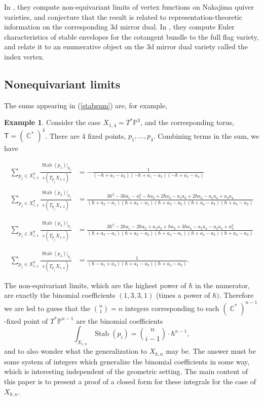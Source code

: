 \documentclass[12 pt]{article}
\theoremstyle{plain}
\theoremstyle{plain}
\theoremstyle{plain}
\theoremstyle{plain}
\theoremstyle{plain}
\theoremstyle{plain}
\theoremstyle{plain}
\theoremstyle{plain}
\theoremstyle{plain}
\theoremstyle{plain}
\theoremstyle{remark}
\theoremstyle{remark}
\theoremstyle{definition}
\theoremstyle{definition}
\theoremstyle{definition}
\newtheorem{example}{Example}[section]
\theoremstyle{definition}
\theoremstyle{definition}
\theoremstyle{definition}
\DeclareMathOperator{\C}{\mathbb{C}}
\DeclareMathOperator{\stab}{\text{Stab}}
\newcommand{\bT}{\mathsf{T}}
\begin{document}
In \cite{DSm}, they compute non-equivariant limits of vertex functions on Nakajima quiver varieties, and conjecture that the result is related to representation-theoretic information on the corresponding 3d mirror dual. In \cite{DSm2}, they compute Euler characteristics of stable envelopes for the cotangent bundle to the full flag variety, and relate it to an enumerative object on the 3d mirror dual variety called the index vertex. 

\subsection{Nonequivariant limits}

The sums appearing in (\ref{stabsum}) are, for example,

\begin{example}
Consider the case $X_{1,4}=T^*\mathbb P^3$, and the corresponding torus, $\bT=(\C^*)^4$. There are 4 fixed points, $p_1,\dots,p_4$. Combining terms in the sum, we have

\begin{align*}
\sum\limits_{p_{j}\in X_{1,4}^{\bT}}\frac{\stab(p_{1})|_{p_{j}}}{e(T_{p_{j}}X_{1,4})}
&=-\frac{1}{(-\hbar+a_{1}-a_{2})(-\hbar+a_{1}-a_{3})(-\hbar+a_{1}-a_{4})}\\
\\
\sum\limits_{p_{j}\in X_{1,4}^{\bT}}\frac{\stab(p_{2})|_{p_{j}}}{e(T_{p_{j}}X_{1,4})}
&=\frac{3\hbar^{2}-3\hbar a_{1}-a_{1}^{2}-\hbar a_{2}+2\hbar a_{3}-a_{1}a_{3}+2\hbar a_{4}-a_{1}a_{4}+a_{3}a_{4}}{(\hbar+a_{2}-a_{1})(\hbar+a_{3}-a_{1})(\hbar+a_{3}-a_{2})(\hbar+a_{4}-a_{3})(\hbar+a_{4}-a_{2})}\\
\\
\\
\sum\limits_{p_{j}\in X_{1,4}^{\bT}}\frac{\stab(p_{3})|_{p_{j}}}{e(T_{p_{j}}X_{1,4})}
&=\frac{3\hbar^{2}-2\hbar a_{1}-2\hbar a_{2}+a_{1}a_{2}+\hbar a_{3}+3\hbar a_{4}-a_{1}a_{4}-a_{2}a_{4}+a_{4}^2}{(\hbar+a_{3}-a_{1})(\hbar+a_{3}-a_{2})(\hbar+a_{4}-a_{1})(\hbar+a_{4}-a_{2})(\hbar+a_{4}-a_{3})}\\
\\
\\
\sum\limits_{p_{j}\in X_{1,4}^{\bT}}\frac{\stab(p_{4})|_{p_{j}}}{e(T_{p_{j}}X_{1,4})}
&=\frac{1}{(\hbar-a_{1}+a_{4})(\hbar+a_{4}-a_{2})(\hbar+a_{4}-a_{3})}.
\end{align*}

\end{example}
The non-equivariant limits, which are the highest power of $\hbar$ in the numerator, are exactly the binomial coefficients $(1,3,3,1)$ (times a power of $\hbar)$. Therefore we are led to guess that the ${n\choose 1}=n$ integers corresponding to each $(\C^*)^{n-1}$-fixed point of $T^*\mathbb{P}^{n-1}$ are the binomial coefficients
\[
\int_{X_{1,n}}\stab(p_i)=\binom{n}{i-1}\cdot \hbar^{n-1},
\]
and to also wonder what the generalization to $X_{k,n}$ may be. The answer must be some system of integers which generalize the binomial coefficients in some way, which is interesting independent of the geometric setting. The main content of this paper is to present a proof of a closed form for these integrals for the case of $X_{k,n}$. 
\end{document}
